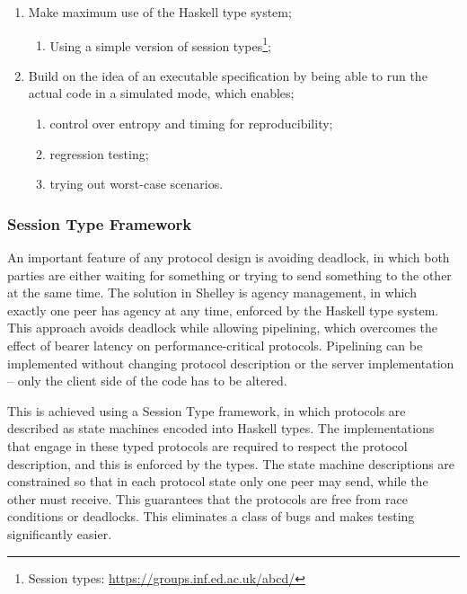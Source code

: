 \documentclass[11pt,a4paper]{article}
\begin{document}
\begin{enumerate}
\item
  Make maximum use of the Haskell type system;

  \begin{enumerate}
  \item
    Using a simple version of session types\footnote{Session types:
      \href{https://groups.inf.ed.ac.uk/abcd/}{{https://groups.inf.ed.ac.uk/abcd/}}};
  \end{enumerate}
\item
  Build on the idea of an executable specification by being able to run
  the actual code in a simulated mode, which enables;

  \begin{enumerate}
  \item
    control over entropy and timing for reproducibility;
  \item
    regression testing;
  \item
    trying out worst-case scenarios.
  \end{enumerate}
\end{enumerate}

\subsubsection{Session Type Framework}
\label{session-type-framework}

An important feature of any protocol design is avoiding deadlock, in
which both parties are either waiting for something or trying to send
something to the other at the same time. The solution in Shelley is
agency management, in which exactly one peer has agency at any time,
enforced by the Haskell type system. This approach avoids deadlock while
allowing pipelining, which overcomes the effect of bearer latency on
performance-critical protocols. Pipelining can be implemented without
changing protocol description or the server implementation -- only the
client side of the code has to be altered.

This is achieved using a Session Type framework, in which protocols are
described as state machines encoded into Haskell types. The
implementations that engage in these typed protocols are required to
respect the protocol description, and this is enforced by the types. The
state machine descriptions are constrained so that in each protocol
state only one peer may send, while the other must receive. This
guarantees that the protocols are free from race conditions or
deadlocks. This eliminates a class of bugs and makes testing
significantly easier.
\end{document}
